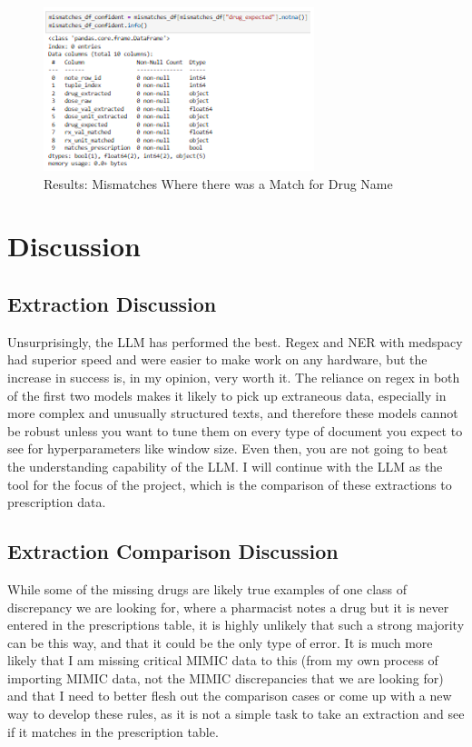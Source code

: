 \documentclass[sigconf,nonacm]{acmart} %
\begin{document}
\begin{figure}[t]
  \centering
  \includegraphics[width=\linewidth]{mismatches.png}
  \caption{Results: Mismatches Where there was a Match for Drug Name}
  \label{fig:pipeline}
\end{figure}

\section{Discussion}
\subsection{Extraction Discussion}
Unsurprisingly, the LLM has performed the best. Regex and NER with medspacy had superior speed and were easier to make work on any hardware, but the increase in success is, in my opinion, very worth it. The reliance on regex in both of the first two models makes it likely to pick up extraneous data, especially in more complex and unusually structured texts, and therefore these models cannot be robust unless you want to tune them on every type of document you expect to see for hyperparameters like window size. Even then, you are not going to beat the understanding capability of the LLM. I will continue with the LLM as the tool for the focus of the project, which is the comparison of these extractions to prescription data.

\subsection{Extraction Comparison Discussion}
While some of the missing drugs are likely true examples of one class of discrepancy we are looking for, where a pharmacist notes a drug but it is never entered in the prescriptions table, it is highly unlikely that such a strong majority can be this way, and that it could be the only type of error. It is much more likely that I am missing critical MIMIC data to this (from my own process of importing MIMIC data, not the MIMIC discrepancies that we are looking for) and that I need to better flesh out the comparison cases or come up with a new way to develop these rules, as it is not a simple task to take an extraction and see if it matches in the prescription table.
\end{document}
